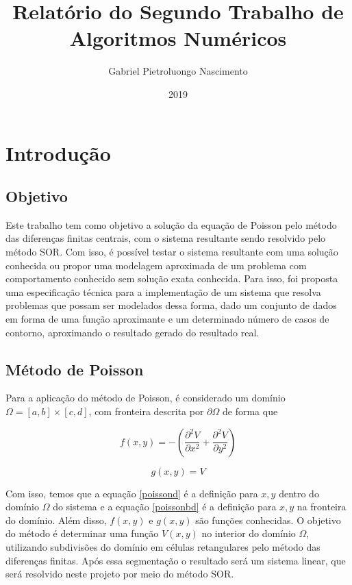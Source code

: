 \documentclass[oneside]{abntex2}
\title{Relatório do Segundo Trabalho de Algoritmos Numéricos}
\author{Gabriel Pietroluongo Nascimento}
\date{2019}
\begin{document}
\imprimircapa
\tableofcontents
\chapter{Introdução}
\section{Objetivo} \label{sec_obj}
Este trabalho tem como objetivo a solução da equação de Poisson pelo método das diferenças finitas centrais, com o sistema resultante sendo resolvido pelo método SOR. Com isso, é possível testar o sistema resultante com uma solução conhecida ou propor uma modelagem aproximada de um problema com comportamento conhecido sem solução exata conhecida. Para isso, foi proposta uma especificação técnica para a implementação de um sistema que resolva problemas que possam ser modelados dessa forma, dado um conjunto de dados em forma de uma função aproximante e um determinado número de casos de contorno, aproximando o resultado gerado do resultado real. 

\section{Método de Poisson} \label{sec_method}
Para a aplicação do método de Poisson, é considerado um domínio $\Omega = [a, b]\times[c, d]$, com fronteira descrita por $\partial{\Omega}$ de forma que

\begin{equation}
\label{poissond}
    f(x, y) = - \left(\frac{\partial^2{V}}{\partial{x^2}} + \frac{\partial^2{V}}{\partial{y^2}}\right)
\end{equation}

\begin{equation}
\label{poissonbd}
    g(x, y) = V
\end{equation}

Com isso, temos que a equação \ref{poissond} é a definição para $x, y$ dentro do domínio $\Omega$ do sistema e a equação \ref{poissonbd} é a definição para $x, y$ na fronteira do domínio. Além disso, $f(x,y)$ e $g(x,y)$ são funções conhecidas. O objetivo do método é determinar uma função $V(x,y)$ no interior do domínio $\Omega$, utilizando subdivisões do domínio em células retangulares pelo método das diferenças finitas. Após essa segmentação o resultado será um sistema linear, que será resolvido neste projeto por meio do método SOR.
\end{document}
